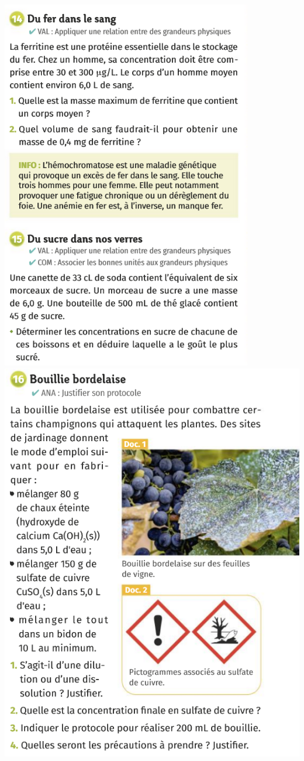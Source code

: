 \begin{center}
\includegraphics[scale=1.1]{Images/Chapitre_2/Ex_14.png}
\vspace{1cm}
\includegraphics[scale=0.9]{Images/Chapitre_2/Ex_16.png}

\end{center}
